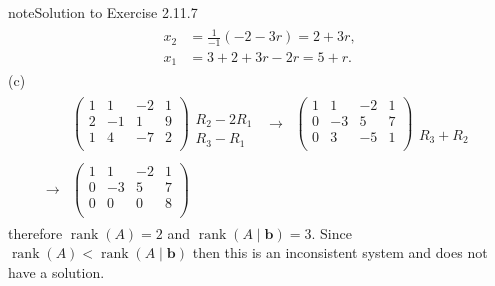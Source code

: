 \documentclass[letterpaper,10pt,english]{jupyterBook}
\begin{document}
\begin{sphinxadmonition}{note}{Solution to Exercise 2.11.7}
\begin{equation*}
\begin{split}
\begin{align*}
    x_2 &= \frac{1}{-1}(-2 - 3r) = 2 + 3r, \\
    x_1 &= 3 + 2 + 3r - 2r = 5 + r.
\end{align*} \end{split}
\end{equation*}
\sphinxAtStartPar
(c)
\begin{equation*}
\begin{split} \begin{align*}
&    \left( \begin{array}{ccc|c}
         1 & 1 & -2 & 1 \\
         2 & -1 & 1 & 9 \\
         1 & 4 & -7 & 2 \\
    \end{array} \right)
    \begin{matrix} \phantom{x} \\ R_{2} - 2 R_{1} \\ R_{3} - R_{1} \end{matrix} &
    \longrightarrow &
    \left( \begin{array}{ccc|c}
         1 & 1 & -2 & 1 \\
         0 & -3 & 5 & 7 \\
         0 & 3 & -5 & 1 \\
    \end{array} \right)
    \begin{matrix} \phantom{x} \\ \phantom{x} \\ R_{3} + R_{2} \end{matrix} \\ \\
    \longrightarrow &
    \left( \begin{array}{ccc|c}
         1 & 1 & -2 & 1 \\
         0 & -3 & 5 & 7 \\
         0 & 0 & 0 & 8 \\
    \end{array} \right)
\end{align*} \end{split}
\end{equation*}
\sphinxAtStartPar
therefore \(\operatorname{rank}(A) = 2\) and \(\operatorname{rank}(A \mid \mathbf{b}) = 3\). Since \(\operatorname{rank}(A) < \operatorname{rank}(A \mid \mathbf{b})\) then this is an inconsistent system and does not have a solution.
\end{sphinxadmonition}
\end{document}
